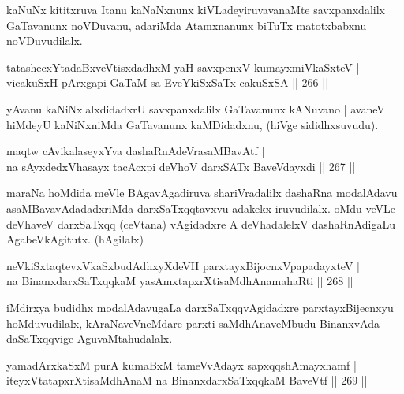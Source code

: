 \begin{artha}
kaNuNx kititxruva Itanu kaNaNxnunx kiVLadeyiruvavanaMte savxpanxdalilx GaTavanunx noVDuvanu, adariMda Atamxnanunx biTuTx matotxbabxnu noVDuvudilalx.
\end{artha}


\begin{shl}
tatashecxYtadaBxveVtisxdadhxM yaH savxpenxV kumayxmiVkaSxteV | \\
vicakuSxH pArxgapi GaTaM sa EveYkiSxSaTx cakuSxSA \hfill ||  266 ||  
\end{shl}

\begin{artha}
yAvanu kaNiNxlalxdidadxrU savxpanxdalilx GaTavanunx kANuvano | avaneV hiMdeyU kaNiNxniMda GaTavanunx kaMDidadxnu, (hiVge sididhxsuvudu).
\end{artha}

\begin{shl}
maqtw cAvikalaseyxYva dashaRnAdeVrasaMBavAtf | \\
na sAyxdedxVhasayx tacAcxpi deVhoV darxSATx BaveVdayxdi \hfill ||  267 ||  
\end{shl}

\begin{artha}
maraNa hoMdida meVle BAgavAgadiruva shariVradalilx dashaRna modalAdavu asaMBavavAdadadxriMda darxSaTxqqtavxvu adakekx iruvudilalx. oMdu veVLe deVhaveV darxSaTxqq (ceVtana) vAgidadxre A deVhadalelxV dashaRnAdigaLu AgabeVkAgitutx. (hAgilalx)
\end{artha}

\begin{shl}
neVkiSxtaqtevxV\s kaSxbudAdhxyXdeVH parxtayxBijocnxVpapadayxteV | \\
na BinanxdarxSaTxqqkaM yasAmxtapxrXtisaMdhAnamahaRti \hfill ||  268 ||  
\end{shl}

\begin{artha}
iMdirxya budidhx modalAdavugaLa darxSaTxqqvAgidadxre parxtayxBijecnxyu hoMduvudilalx, kAraNaveVneMdare parxti saMdhAnaveMbudu BinanxvAda daSaTxqqvige AguvaMtahudalalx.
\end{artha}


\begin{shl}
yamadArxkaSxM purA kumaBxM tameVvAdayx sapxqqshAmayxhamf | \\
iteyxVtatapxrXtisaMdhAnaM na BinanxdarxSaTxqqkaM BaveVtf \hfill ||  269 ||  
\end{shl}

